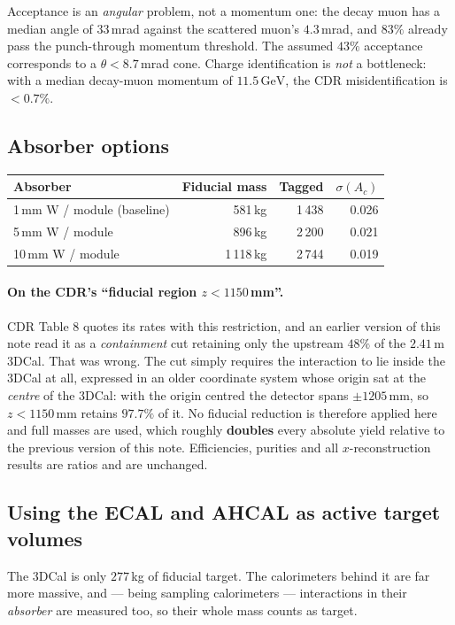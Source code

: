 \documentclass[11pt,a4paper]{article}
\newcommand{\GeV}{\,\mathrm{GeV}}
\begin{document}
Acceptance is an \emph{angular} problem, not a momentum one: the decay muon has a
median angle of $33\,$mrad against the scattered muon's $4.3\,$mrad, and $83\%$
already pass the punch-through momentum threshold. The assumed $43\%$ acceptance
corresponds to a $\theta<8.7\,$mrad cone. Charge identification is
\emph{not} a bottleneck: with a median decay-muon momentum of $11.5\GeV$, the
CDR misidentification is $<0.7\%$.

\subsection{Absorber options}
\begin{center}\small
\begin{tabular}{lrrr}
\toprule
Absorber & Fiducial mass & Tagged & $\sigma(A_c)$ \\
\midrule
1\,mm W / module (baseline) & 581\,kg & 1\,438 & 0.026 \\
5\,mm W / module & 896\,kg & 2\,200 & 0.021 \\
10\,mm W / module & 1\,118\,kg & 2\,744 & 0.019 \\
\bottomrule
\end{tabular}
\end{center}

\paragraph{On the CDR's ``fiducial region $z<1150\,$mm''.} CDR Table 8 quotes
its rates with this restriction, and an earlier version of this note read it as a
\emph{containment} cut retaining only the upstream $48\%$ of the $2.41\,$m 3DCal.
That was wrong. The cut simply requires the interaction to lie inside the 3DCal
at all, expressed in an older coordinate system whose origin sat at the
\emph{centre} of the 3DCal: with the origin centred the detector spans
$\pm1205\,$mm, so $z<1150\,$mm retains $97.7\%$ of it. No fiducial reduction is
therefore applied here and full masses are used, which roughly \textbf{doubles}
every absolute yield relative to the previous version of this note. Efficiencies,
purities and all $x$-reconstruction results are ratios and are unchanged.

\subsection{Using the ECAL and AHCAL as active target volumes}
\label{sec:ecalahcal}

The 3DCal is only $277\,$kg of fiducial target. The calorimeters behind it are
far more massive, and --- being sampling calorimeters --- interactions in their
\emph{absorber} are measured too, so their whole mass counts as target.
\end{document}
